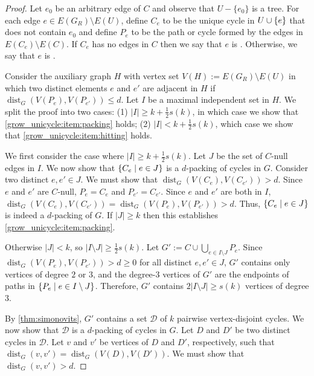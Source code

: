 \documentclass{patmorin}
\DeclareMathOperator{\dist}{dist}
\DeclarePairedDelimiter\set{\{}{\}}
\begin{document}
\begin{proof}
  Let $e_0$ be an arbitrary edge of $C$ and observe that $U-\{e_0\}$ is a tree.  For each edge $e\in E(G_{R})\setminus E(U)$,  define $C_e$ to be the unique cycle in $U\cup \set{e}$ 
  that does not contain $e_0$ and define $P_{e}$ to be the path or cycle formed by the edges in $E(C_{e})\setminus E(C)$.
  If $C_e$ has no edges in $C$ then we say that $e$ is .
  Otherwise, we say that $e$ is .
  
  Consider the auxiliary graph $H$ with vertex set $V(H):= E(G_{R})\setminus E(U)$ in which two distinct elements $e$ and $e'$ are adjacent in $H$ if $\dist_G(V(P_{e}),V(P_{e'})) \le d$.  Let $I$ be a maximal independent set in $H$. 
  We split the proof into two cases: 
  (1) $|I|\ge k+\frac{1}{2}s(k)$, in which case we show that \cref{grow_unicycle:item:packing} holds;
  (2) $|I|< k+\frac{1}{2}s(k)$, which case we show that \cref{grow_unicycle:item:hitting} holds.
  
  We first consider the case where $|I|\ge k+\frac{1}{2}s(k)$.  Let $J$ be the set of $C$-null edges in $I$. 
  We now show that $\set{C_e \mid e\in J}$ is a $d$-packing of cycles in $G$.  Consider two distinct $e,e'\in J$.  We must show that $\dist_G(V(C_e),V(C_{e'}))>d$.
  Since $e$ and $e'$ are $C$-null, $P_e=C_e$ and $P_{e'}=C_{e'}$.
  Since $e$ and $e'$ are both in $I$, $\dist_G(V(C_e),V(C_{e'}))=\dist_G(V(P_e),V(P_{e'}))>d$. 
  Thus, $\set{C_e \mid e\in J}$ is indeed a $d$-packing of $G$.  If $|J|\ge k$ then this establishes \eqref{grow_unicycle:item:packing}.  

  Otherwise $|J|<k$, so $|I\setminus J|\ge \tfrac{1}{2}s(k)$.
  Let $G':=C\cup\bigcup_{e\in I\setminus J} P_e$.
  Since $\dist_G(V(P_e),V(P_{e'}))>d\ge0$ for all distinct $e,e'\in J$, $G'$ contains only vertices of degree $2$ or $3$, and the degree-$3$ vertices of $G'$ are the endpoints of paths in $\set{P_e \mid e\in I\setminus J}$.
  Therefore, $G'$ contains $2|I\setminus J|\geq s(k)$ vertices of degree $3$.
  
  By \cref{thm:simonovits}, $G'$ contains a set $\mathcal{D}$ of $k$ pairwise vertex-disjoint cycles.
  We now show that $\mathcal{D}$ is a $d$-packing of cycles in $G$.
  Let $D$ and $D'$ be two distinct cycles in $\mathcal{D}$.
  Let $v$ and $v'$ be vertices of $D$ and $D'$, respectively,
  such that $\dist_G(v,v')=\dist_G(V(D),V(D'))$.  We must show that $\dist_G(v,v')>d$.


\end{proof}
\end{document}
